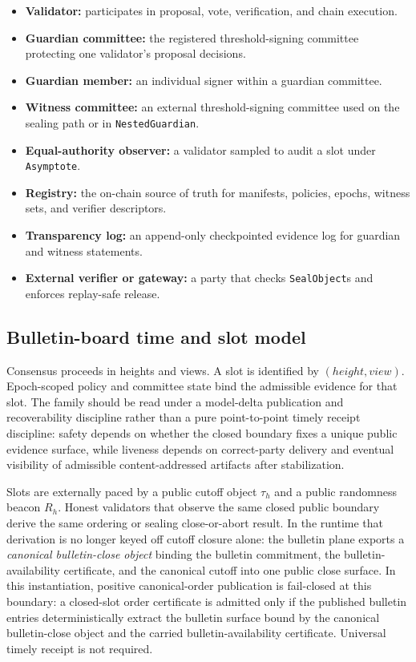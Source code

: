 \documentclass[11pt]{article}
\newcommand{\code}[1]{\texttt{#1}}
\newcommand{\term}[1]{\textit{#1}}
\begin{document}
\begin{itemize}[leftmargin=1.5em]
\item \textbf{Validator:} participates in proposal, vote, verification, and
chain execution.
\item \textbf{Guardian committee:} the registered threshold-signing committee
protecting one validator's proposal decisions.
\item \textbf{Guardian member:} an individual signer within a guardian
committee.
\item \textbf{Witness committee:} an external threshold-signing committee used
on the sealing path or in \code{NestedGuardian}.
\item \textbf{Equal-authority observer:} a validator sampled to audit a slot
under \code{Asymptote}.
\item \textbf{Registry:} the on-chain source of truth for manifests, policies,
epochs, witness sets, and verifier descriptors.
\item \textbf{Transparency log:} an append-only checkpointed evidence log for
guardian and witness statements.
\item \textbf{External verifier or gateway:} a party that checks
\code{SealObject}s and enforces replay-safe release.
\end{itemize}

\subsection{Bulletin-board time and slot model}

Consensus proceeds in heights and views. A slot is identified by
\((height, view)\). Epoch-scoped policy and committee state bind the
admissible evidence for that slot. The family should be read under a
model-delta publication and recoverability discipline rather than a pure
point-to-point timely receipt discipline: safety depends on whether the closed
boundary fixes a unique public evidence surface, while liveness depends on
correct-party delivery and eventual visibility of admissible content-addressed
artifacts after stabilization.

Slots are externally paced by a public cutoff object \(\tau_h\) and a public
randomness beacon \(R_h\). Honest validators that observe the same closed
public boundary derive the same ordering or sealing close-or-abort result. In
the runtime that derivation is no longer keyed off cutoff closure alone:
the bulletin plane exports a
\term{canonical bulletin-close object} binding the bulletin commitment, the
bulletin-availability certificate, and the canonical cutoff into one public
close surface. In this instantiation, positive canonical-order
publication is fail-closed at this boundary: a closed-slot order certificate is
admitted only if the published bulletin entries deterministically extract the
bulletin surface bound by the canonical bulletin-close object and the carried
bulletin-availability certificate. Universal timely receipt is not required.
\end{document}
